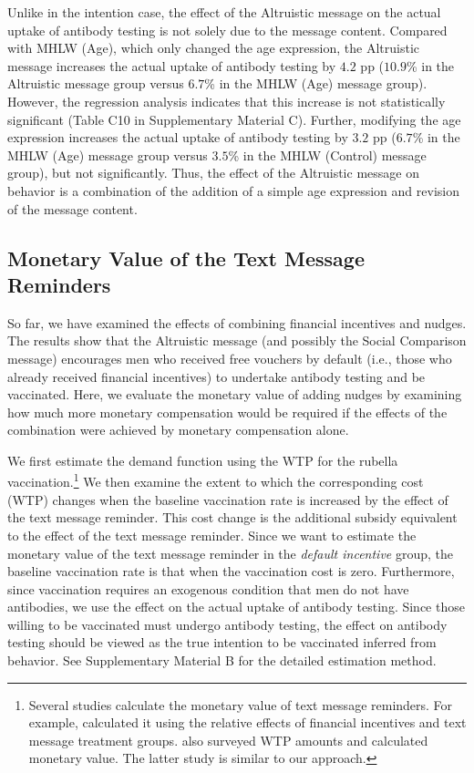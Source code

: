 \documentclass[
  11pt,
  a4paper
]{article}
\begin{document}
Unlike in the intention case, the effect of the Altruistic message on the actual uptake of antibody testing is not solely due to the message content. Compared with MHLW (Age), which only changed the age expression, the Altruistic message increases the actual uptake of antibody testing by \(4.2\) pp (\(10.9\)\% in the Altruistic message group versus \(6.7\)\% in the MHLW (Age) message group). However, the regression analysis indicates that this increase is not statistically significant (Table C10 in Supplementary Material C). Further, modifying the age expression increases the actual uptake of antibody testing by \(3.2\) pp (\(6.7\)\% in the MHLW (Age) message group versus \(3.5\)\% in the MHLW (Control) message group), but not significantly. Thus, the effect of the Altruistic message on behavior is a combination of the addition of a simple age expression and revision of the message content.

\hypertarget{monetary-value-of-the-text-message-reminders}{%
\subsection{Monetary Value of the Text Message Reminders}\label{monetary-value-of-the-text-message-reminders}}

So far, we have examined the effects of combining financial incentives and nudges. The results show that the Altruistic message (and possibly the Social Comparison message) encourages men who received free vouchers by default (i.e., those who already received financial incentives) to undertake antibody testing and be vaccinated. Here, we evaluate the monetary value of adding nudges by examining how much more monetary compensation would be required if the effects of the combination were achieved by monetary compensation alone.

We first estimate the demand function using the WTP for the rubella vaccination.\footnote{Several studies calculate the monetary value of text message reminders. For example, \citet{Bursztyn2019} calculated it using the relative effects of financial incentives and text message treatment groups. \citet{Moriwaki2020} also surveyed WTP amounts and calculated monetary value. The latter study is similar to our approach.} We then examine the extent to which the corresponding cost (WTP) changes when the baseline vaccination rate is increased by the effect of the text message reminder. This cost change is the additional subsidy equivalent to the effect of the text message reminder. Since we want to estimate the monetary value of the text message reminder in the \emph{default incentive} group, the baseline vaccination rate is that when the vaccination cost is zero. Furthermore, since vaccination requires an exogenous condition that men do not have antibodies, we use the effect on the actual uptake of antibody testing. Since those willing to be vaccinated must undergo antibody testing, the effect on antibody testing should be viewed as the true intention to be vaccinated inferred from behavior. See Supplementary Material B for the detailed estimation method.
\end{document}
